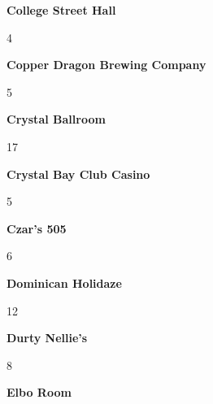 \newline 
\begin{center}\textbf{College Street Hall}\end{center}
\begin{center}4\end{center} 
\newline 
\begin{center}\textbf{Copper Dragon Brewing Company}\end{center}
\begin{center}5\end{center} 
\newline 
\begin{center}\textbf{Crystal Ballroom}\end{center}
\begin{center}17\end{center} 
\newline 
\begin{center}\textbf{Crystal Bay Club Casino}\end{center}
\begin{center}5\end{center} 
\newline 
\begin{center}\textbf{Czar's 505}\end{center}
\begin{center}6\end{center} 
\newline 
\begin{center}\textbf{Dominican Holidaze}\end{center}
\begin{center}12\end{center} 
\newline 
\begin{center}\textbf{Durty Nellie's}\end{center}
\begin{center}8\end{center} 
\newline 
\begin{center}\textbf{Elbo Room}\end{center}
